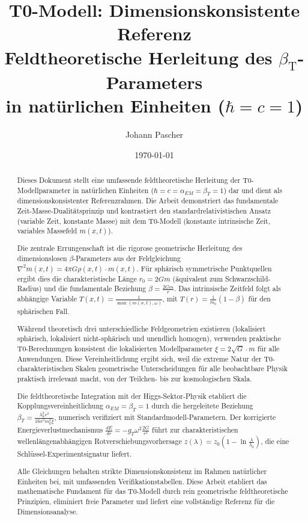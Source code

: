 \documentclass[12pt,a4paper]{article}
\newcommand{\betaT}{\beta_{\text{T}}}
\begin{document}
	
	\title{T0-Modell: Dimensionskonsistente Referenz \\
		Feldtheoretische Herleitung des $\betaT$-Parameters \\
		in natürlichen Einheiten ($\hbar = c = 1$)}
	\author{Johann Pascher}
	\date{\today}
	
	\maketitle
	\begin{abstract}
		Dieses Dokument stellt eine umfassende feldtheoretische Herleitung der T0-Modellparameter in natürlichen Einheiten ($\hbar = c = \alpha_{EM} = \beta_T = 1$) dar und dient als dimensionskonsistenter Referenzrahmen. Die Arbeit demonstriert das fundamentale Zeit-Masse-Dualitätsprinzip und kontrastiert den standardrelativistischen Ansatz (variable Zeit, konstante Masse) mit dem T0-Modell (konstante intrinsische Zeit, variables Massefeld $m(x,t)$).
		
		Die zentrale Errungenschaft ist die rigorose geometrische Herleitung des dimensionslosen $\beta$-Parameters aus der Feldgleichung $\nabla^2 m(x,t) = 4\pi G \rho(x,t) \cdot m(x,t)$. Für sphärisch symmetrische Punktquellen ergibt dies die charakteristische Länge $r_0 = 2Gm$ (äquivalent zum Schwarzschild-Radius) und die fundamentale Beziehung $\beta = \frac{2Gm}{r}$. Das intrinsische Zeitfeld folgt als abhängige Variable $T(x,t) = \frac{1}{\max(m(x,t), \omega)}$, mit $T(r) = \frac{1}{m_0}(1-\beta)$ für den sphärischen Fall.
		
		Während theoretisch drei unterschiedliche Feldgeometrien existieren (lokalisiert sphärisch, lokalisiert nicht-sphärisch und unendlich homogen), verwenden praktische T0-Berechnungen konsistent die lokalisierten Modellparameter $\xi = 2\sqrt{G} \cdot m$ für alle Anwendungen. Diese Vereinheitlichung ergibt sich, weil die extreme Natur der T0-charakteristischen Skalen geometrische Unterscheidungen für alle beobachtbare Physik praktisch irrelevant macht, von der Teilchen- bis zur kosmologischen Skala.
		
		Die feldtheoretische Integration mit der Higgs-Sektor-Physik etabliert die Kopplungsvereinheitlichung $\alpha_{EM} = \beta_T = 1$ durch die hergeleitete Beziehung $\beta_T = \frac{\lambda_h^2 v^2}{16\pi^3 m_h^2 \xi}$, numerisch verifiziert mit Standardmodell-Parametern. Der korrigierte Energieverlustmechanismus $\frac{dE}{dr} = -g_T \omega^2 \frac{2G}{r^2}$ führt zur charakteristischen wellenlängenabhängigen Rotverschiebungsvorhersage $z(\lambda) = z_0(1 - \ln\frac{\lambda}{\lambda_0})$, die eine Schlüssel-Experimentsignatur liefert.
		
		Alle Gleichungen behalten strikte Dimensionskonsistenz im Rahmen natürlicher Einheiten bei, mit umfassenden Verifikationstabellen. Diese Arbeit etabliert das mathematische Fundament für das T0-Modell durch rein geometrische feldtheoretische Prinzipien, eliminiert freie Parameter und liefert eine vollständige Referenz für die Dimensionsanalyse.
	\end{abstract}
	
\end{document}

